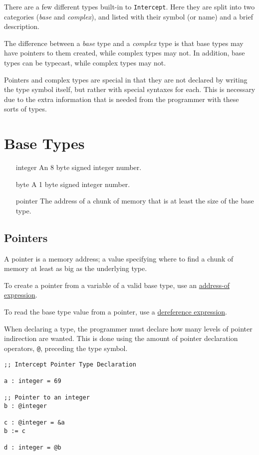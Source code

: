 \documentclass[12pt]{report}
\begin{document}
There are a few different types built-in to \verb|Intercept|. Here they are split into two categories (\emph{base} and \emph{complex}), and listed with their symbol (or name) and a brief description.

The difference between a \emph{base} type and a \emph{complex} type is that base types may have pointers to them created, while complex types may not. In addition, base types can be typecast, while complex types may not.

Pointers and complex types are special in that they are not declared by writing the type symbol itself, but rather with special syntaxes for each. This is necessary due to the extra information that is needed from the programmer with these sorts of types.

\section{Base Types}
\label{subsec:types-base-types}

\begin{itemize}
\item[integer]  An 8 byte signed integer number.
\item[byte]     A 1 byte signed integer number.
\item[pointer]  The address of a chunk of memory that is at least the size of the base type.
\end{itemize}

\subsection*{Pointers}

A pointer is a memory address; a value specifying where to find a chunk of memory at least as big as the underlying type.

To create a pointer from a variable of a valid base type, use an \hyperref[subsec:expressions-address-of]{address-of expression}.

To read the base type value from a pointer, use a \hyperref[subsec:expressions-dereference]{dereference expression}.

When declaring a type, the programmer must declare how many levels of pointer indirection are wanted. This is done using the amount of pointer declaration operators, \verb|@|, preceding the type symbol.

\begin{Verbatim}[samepage=true]
;; Intercept Pointer Type Declaration

a : integer = 69

;; Pointer to an integer
b : @integer

c : @integer = &a
b := c

d : integer = @b
\end{Verbatim}
\end{document}
